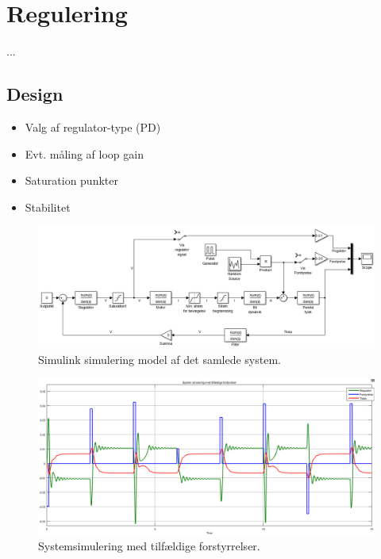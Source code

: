 \section{Regulering}\label{sec:regulering}

...
\subsection{Design}

\begin{itemize}
	\item Valg af regulator-type (PD)
	\item Evt. måling af loop gain 
	\item Saturation punkter
	\item Stabilitet
\end{itemize}

\begin{figure}[h!]
	\centering
	\includegraphics[width=1\textwidth]{billeder/transfunc_sim.png}
	\caption{Simulink simulering model af det samlede system.}
	\label{fig:transfunc_sim}
\end{figure}
\FloatBlock 


\begin{figure}[h!]
	\centering
	\includegraphics[width=1\textwidth]{billeder/system_sim_stimuli.png}
	\caption{Systemsimulering med tilfældige forstyrrelser.}
	\label{fig:system_sim_stimuli}
\end{figure}
\FloatBlock 